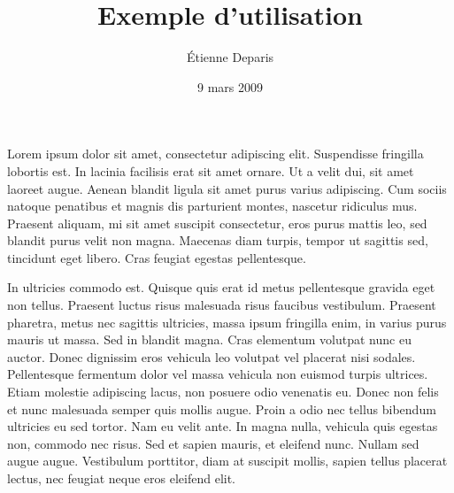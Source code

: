 \documentclass[a4paper,12pt]{article}
\title{Exemple d'utilisation}
\author{Étienne Deparis}
\date{9 mars 2009}
\begin{document}
\titrearticle

Lorem ipsum dolor sit amet, consectetur adipiscing elit. Suspendisse
fringilla lobortis est. In lacinia facilisis erat sit amet ornare. Ut
a velit dui, sit amet laoreet augue. Aenean blandit ligula sit amet
purus varius adipiscing. Cum sociis natoque penatibus et magnis dis
parturient montes, nascetur ridiculus mus. Praesent aliquam, mi sit
amet suscipit consectetur, eros purus mattis leo, sed blandit purus
velit non magna. Maecenas diam turpis, tempor ut sagittis sed,
tincidunt eget libero. Cras feugiat egestas pellentesque.

In ultricies commodo est. Quisque quis erat id metus pellentesque
gravida eget non tellus. Praesent luctus risus malesuada risus
faucibus vestibulum. Praesent pharetra, metus nec sagittis ultricies,
massa ipsum fringilla enim, in varius purus mauris ut massa. Sed in
blandit magna. Cras elementum volutpat nunc eu auctor. Donec dignissim
eros vehicula leo volutpat vel placerat nisi sodales. Pellentesque
fermentum dolor vel massa vehicula non euismod turpis ultrices. Etiam
molestie adipiscing lacus, non posuere odio venenatis eu. Donec non
felis et nunc malesuada semper quis mollis augue. Proin a odio nec
tellus bibendum ultricies eu sed tortor. Nam eu velit ante. In magna
nulla, vehicula quis egestas non, commodo nec risus. Sed et sapien
mauris, et eleifend nunc. Nullam sed augue augue. Vestibulum
porttitor, diam at suscipit mollis, sapien tellus placerat lectus, nec
feugiat neque eros eleifend elit.
\end{document}
